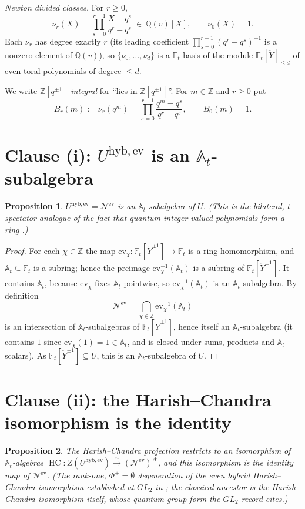 \documentclass[11pt]{article}
\newtheorem{proposition}{Proposition}
\newcommand{\At}{\mathbb{A}_t}
\newcommand{\Ft}{\mathbb{F}_t}
\newcommand{\Nev}{\mathcal N^{\mathrm{ev}}}
\newcommand{\Uev}{U^{\mathrm{hyb,ev}}}
\newcommand{\HC}{\operatorname{HC}}
\newcommand{\Yc}{\check Y}
\newcommand{\Z}{\mathbb Z}
\newcommand{\ev}{\mathrm{ev}}
\begin{document}
\emph{Newton divided classes.}\;
For $r\ge0$,
\[
  \nu_{r}(X)=\prod_{s=0}^{r-1}\frac{X-q^{s}}{q^{r}-q^{s}}\ \in\ \mathbb Q(v)[X],
  \qquad \nu_0(X)=1 .
\]
Each $\nu_r$ has degree exactly $r$ (its leading coefficient
$\prod_{s=0}^{r-1}(q^{r}-q^{s})^{-1}$ is a nonzero element of $\mathbb Q(v)$),
so $\{\nu_0,\dots,\nu_d\}$ is a $\Ft$-basis of the module
$\Ft[\Yc]_{\le d}$ of even toral polynomials of degree $\le d$.

\medskip
We write $\Z[q^{\pm1}]$-\emph{integral} for ``lies in $\Z[q^{\pm1}]$''.
For $m\in\Z$ and $r\ge0$ put
\[
  B_r(m):=\nu_r(q^{m})=\prod_{s=0}^{r-1}\frac{q^{m}-q^{s}}{q^{r}-q^{s}},
  \qquad B_0(m)=1 .
\]

\section{Clause (i): $\Uev$ is an $\At$-subalgebra}

\begin{proposition}
$\Uev=\Nev$ is an $\At$-subalgebra of $U$. (This is the bilateral,
$t$-spectator analogue of the fact that quantum integer-valued polynomials
form a ring \cite[\S1]{HarmanHopkins}.)
\end{proposition}

\begin{proof}
For each $\chi\in\Z$ the map $\ev_\chi\colon\Ft[\Yc^{\pm1}]\to\Ft$ is a ring
homomorphism, and $\At\subseteq\Ft$ is a subring; hence the preimage
$\ev_\chi^{-1}(\At)$ is a subring of $\Ft[\Yc^{\pm1}]$. It contains $\At$,
because $\ev_\chi$ fixes $\At$ pointwise, so $\ev_\chi^{-1}(\At)$ is an
$\At$-subalgebra. By definition
\[
  \Nev=\bigcap_{\chi\in\Z}\ev_\chi^{-1}(\At)
\]
is an intersection of $\At$-subalgebras of $\Ft[\Yc^{\pm1}]$, hence itself an
$\At$-subalgebra (it contains $1$ since $\ev_\chi(1)=1\in\At$, and is closed
under sums, products and $\At$-scalars). As $\Ft[\Yc^{\pm1}]\subseteq U$, this
is an $\At$-subalgebra of $U$.
\end{proof}

\section{Clause (ii): the Harish--Chandra isomorphism is the identity}

\begin{proposition}
The Harish--Chandra projection restricts to an isomorphism of $\At$-algebras
$\HC\colon Z(\Uev)\xrightarrow{\ \sim\ }(\Nev)^{W}$, and this isomorphism is the
identity map of $\Nev$. (The rank-one, $\Phi^{+}=\emptyset$ degeneration of the
even hybrid Harish--Chandra isomorphism established at $GL_2$ in
\cite{SandboxGL2}; the classical ancestor is the Harish--Chandra isomorphism
itself, whose quantum-group form the $GL_2$ record cites.)
\end{proposition}
\end{document}
